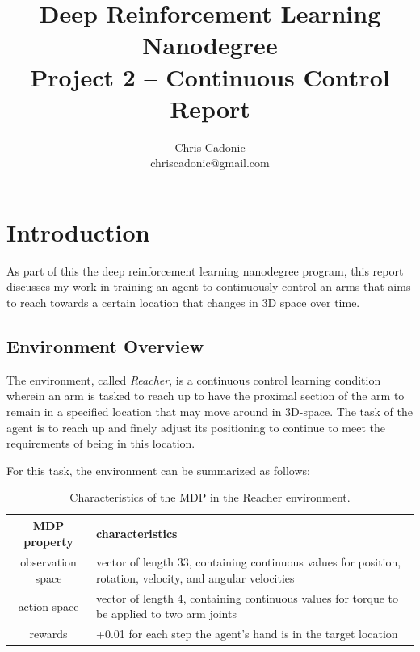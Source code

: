 \documentclass[11pt]{article}
\begin{document}
\title{Deep Reinforcement Learning Nanodegree\\
	   Project 2 -- Continuous Control Report}
\author{\vspace{-1mm}Chris Cadonic\\
chriscadonic@gmail.com}
\maketitle
\vspace{-1.5em}

\section{Introduction}

As part of this the deep reinforcement learning nanodegree program, this report discusses my work in training an agent to continuously control an arms that aims to reach towards a certain location that changes in 3D space over time.

\subsection{Environment Overview}

The environment, called \textit{Reacher}, is a continuous control learning condition wherein an arm is tasked to reach up to have the proximal section of the arm to remain in a specified location that may move around in 3D-space. The task of the agent is to reach up and finely adjust its positioning to continue to meet the requirements of being in this location.

For this task, the environment can be summarized as follows:

\begin{table}[!ht]
	\centering
	\begin{tabular}{ c | p{10cm} }
		\textbf{MDP property} & \textbf{characteristics} \\
		\hline
		observation space & vector of length 33, containing continuous values for position, rotation, velocity, and angular velocities \\
		\hline
		action space & vector of length 4, containing continuous values for torque to be applied to two arm joints \\
		\hline
		rewards & +0.01 for each step the agent's hand is in the target location \\
		\hline
	\end{tabular}
	\caption{Characteristics of the MDP in the Reacher environment.}
	\label{tbl:mdp}
\end{table}
\end{document}
